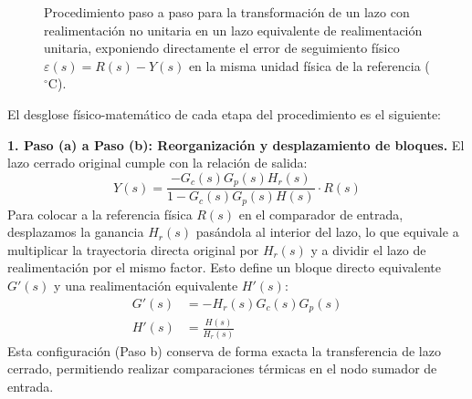 \documentclass[journal,twocolumn]{IEEEtran}
\begin{document}
\begin{figure}[htbp]
{%
    }
    \shorthandon{<}
    \shorthandon{>}
    \caption{Procedimiento paso a paso para la transformación de un lazo con realimentación no unitaria en un lazo equivalente de realimentación unitaria, exponiendo directamente el error de seguimiento físico $\varepsilon(s) = R(s) - Y(s)$ en la misma unidad física de la referencia ($^\circ$C).}
    \label{fig:pasos_error}
\end{figure}

El desglose físico-matemático de cada etapa del procedimiento es el siguiente:

\textbf{1. Paso (a) a Paso (b): Reorganización y desplazamiento de bloques.}
El lazo cerrado original cumple con la relación de salida:
\begin{equation}
    Y(s) = \frac{-G_c(s)G_p(s)H_r(s)}{1 - G_c(s)G_p(s)H(s)} \cdot R(s)
\end{equation}
Para colocar a la referencia física $R(s)$ en el comparador de entrada, desplazamos la ganancia $H_r(s)$ pasándola al interior del lazo, lo que equivale a multiplicar la trayectoria directa original por $H_r(s)$ y a dividir el lazo de realimentación por el mismo factor. Esto define un bloque directo equivalente $G'(s)$ y una realimentación equivalente $H'(s)$:
\begin{align}
    G'(s) &= -H_r(s) G_c(s) G_p(s) \\
    H'(s) &= \frac{H(s)}{H_r(s)}
\end{align}
Esta configuración (Paso b) conserva de forma exacta la transferencia de lazo cerrado, permitiendo realizar comparaciones térmicas en el nodo sumador de entrada.
\end{document}
